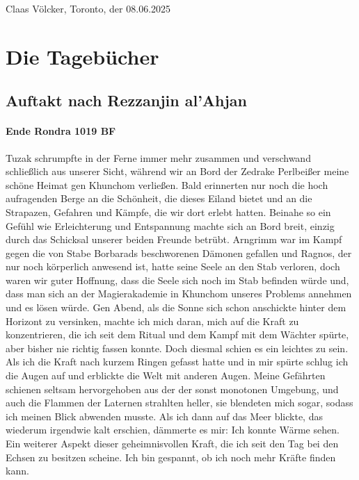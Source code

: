 \begin{flushright}
Claas Völcker, Toronto, der 08.06.2025
\end{flushright}


\section{Die Tagebücher}

\subsection{Auftakt nach Rezzanjin al'Ahjan}

\paragraph{Ende Rondra 1019 BF}
Tuzak schrumpfte in der Ferne immer mehr zusammen und verschwand schließlich aus unserer Sicht, während wir an Bord der Zedrake Perlbeißer meine schöne Heimat gen Khunchom verließen. Bald erinnerten nur noch die hoch aufragenden Berge an die Schönheit, die dieses Eiland bietet und an die Strapazen, Gefahren und Kämpfe, die wir dort erlebt hatten. Beinahe so ein Gefühl wie Erleichterung und Entspannung machte sich an Bord breit, einzig durch das Schicksal unserer beiden Freunde betrübt. Arngrimm war im Kampf gegen die von Stabe Borbarads beschworenen Dämonen gefallen und Ragnos, der nur noch körperlich anwesend ist, hatte seine Seele an den Stab verloren, doch waren wir guter Hoffnung, dass die Seele sich noch im Stab befinden würde und, dass man sich an der Magierakademie in Khunchom unseres Problems annehmen und es lösen würde. Gen Abend, als die Sonne sich schon anschickte hinter dem Horizont zu versinken, machte ich mich daran, mich auf die Kraft zu konzentrieren, die ich seit dem Ritual und dem Kampf mit dem Wächter spürte, aber bisher nie richtig fassen konnte. Doch diesmal schien es ein leichtes zu sein. Als ich die Kraft nach kurzem Ringen gefasst hatte und in mir spürte schlug ich die Augen auf und erblickte die Welt mit anderen Augen. Meine Gefährten schienen seltsam hervorgehoben aus der der sonst monotonen Umgebung, und auch die Flammen der Laternen strahlten heller, sie blendeten mich sogar, sodass ich meinen Blick abwenden musste. Als ich dann auf das Meer blickte, das wiederum irgendwie kalt erschien, dämmerte es mir: Ich konnte Wärme sehen. Ein weiterer Aspekt dieser geheimnisvollen Kraft, die ich seit den Tag bei den Echsen zu besitzen scheine. Ich bin gespannt, ob ich noch mehr Kräfte finden kann.

